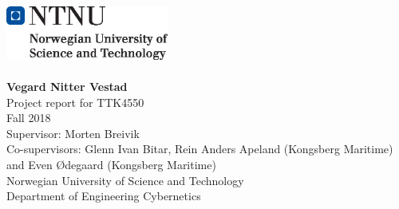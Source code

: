 \begin{titlepage}

\noindent \includegraphics[width = 0.4\textwidth]{front/ntnu_logo.eps}\\[3.0cm]



\\[1cm]		%

\noindent \huge \textbf{Vegard Nitter Vestad} \\ [4cm]


\noindent \Large Project report for TTK4550\\
Fall 2018 \\
Supervisor: 		Morten Breivik \\
Co-supervisors: Glenn Ivan Bitar, Rein Anders Apeland (Kongsberg Maritime) and Even Ødegaard (Kongsberg Maritime) \\ [1cm]


\noindent \Large Norwegian University of Science and Technology \\
Department of Engineering Cybernetics\\


\end{titlepage}